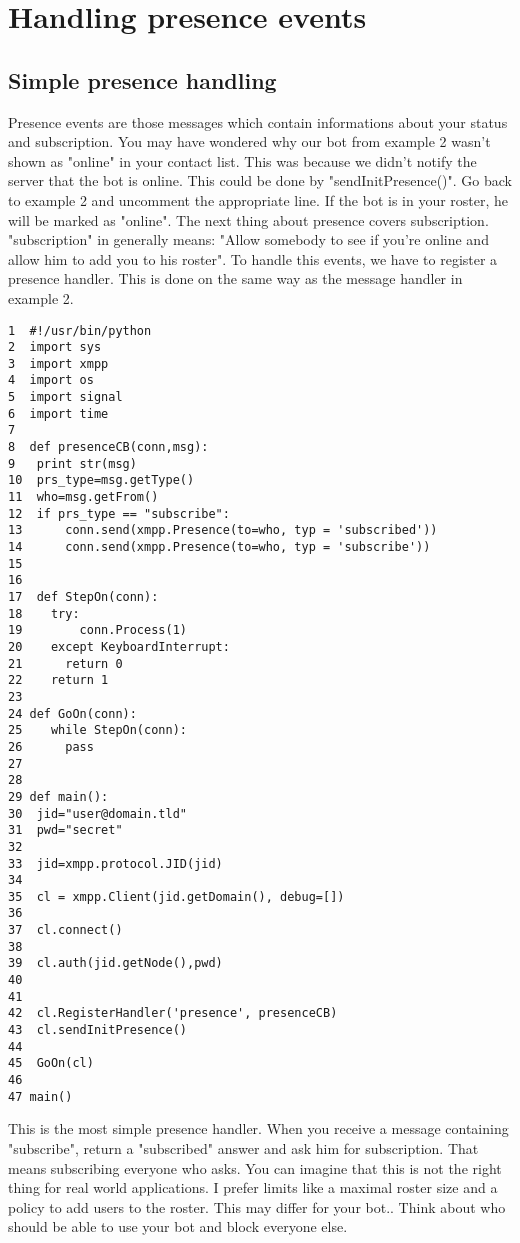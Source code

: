 \section{Handling presence events}

\subsection{Simple presence handling}

Presence events are those messages which contain informations about your status and subscription.
You may have wondered why our bot from example 2 wasn't shown as "online" in your contact list.
This was because we didn't notify the server that the bot is online. This could be done by "sendInitPresence()". Go back to example 2 and uncomment the appropriate line. If the bot is in your roster, he will be marked as "online".
\newline
\newline
The next thing about presence covers subscription. "subscription" in generally means: "Allow somebody to see if you're online and allow him to add you to his roster".
To handle this events, we have to register a presence handler. This is done on the same way as the message handler in example 2.

\begin{verbatim}
1  #!/usr/bin/python
2  import sys
3  import xmpp
4  import os
5  import signal
6  import time
7
8  def presenceCB(conn,msg):
9	print str(msg)
10	prs_type=msg.getType()
11	who=msg.getFrom()
12	if prs_type == "subscribe":
13		conn.send(xmpp.Presence(to=who, typ = 'subscribed'))
14		conn.send(xmpp.Presence(to=who, typ = 'subscribe'))
15
16
17  def StepOn(conn):
18    try:
19        conn.Process(1)
20    except KeyboardInterrupt:
21	    return 0
22    return 1
23
24 def GoOn(conn):
25    while StepOn(conn):
26	    pass
27
28
29 def main():
30	jid="user@domain.tld"
31	pwd="secret"
32
33	jid=xmpp.protocol.JID(jid)
34
35	cl = xmpp.Client(jid.getDomain(), debug=[])
36
37	cl.connect()
38
39	cl.auth(jid.getNode(),pwd)
40
41
42	cl.RegisterHandler('presence', presenceCB)
43	cl.sendInitPresence()
44
45	GoOn(cl)
46
47 main()
\end{verbatim}
This is the most simple presence handler. When you receive a message containing "subscribe", return a "subscribed" answer and ask him for subscription. That means subscribing everyone who asks.
You can imagine that this is not the right thing for real world applications. I prefer limits like a maximal roster size and a policy to add users to the roster. This may differ for your bot..
\newline
Think about who should be able to use your bot and block everyone else.
\newpage
